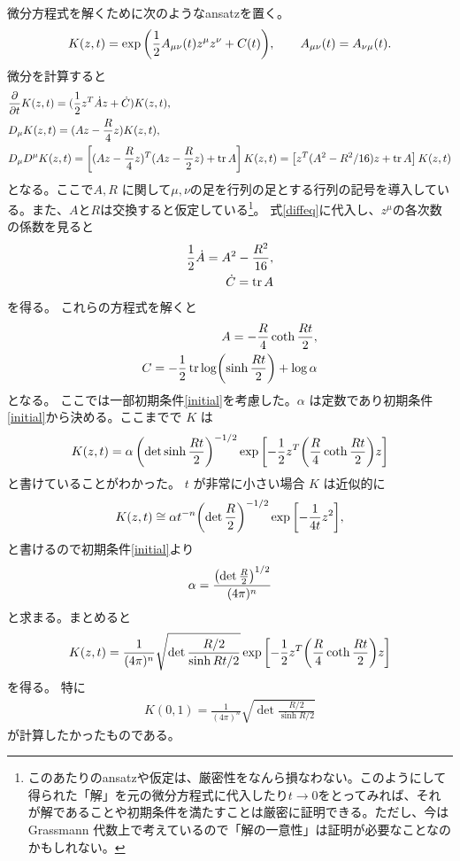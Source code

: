 \documentclass[12pt,a4paper]{jlreq}
\begin{document}
微分方程式を解くために次のようなansatzを置く。
\begin{align}
  K(z,t)=\exp\qty(\frac12 A_{\mu\nu}(t)z^{\mu}z^{\nu}+C(t)),\qquad A_{\mu\nu}(t)=A_{\nu\mu}(t).
\end{align}
微分を計算すると
\begin{align}
   & \pdv{t} K(z,t)=(\frac12 z^T \dot{A} z + \dot{C}) K(z,t),                                    \\
   & D_{\mu} K(z,t)=(A z - \frac{R}{4}z)K(z,t),                                                  \\
   & D_{\mu}D^{\mu}K(z,t)=\left[(A z - \frac{R}{4}z)^{T}(A z - \frac{R}{2}z)+\tr A\right] K(z,t)
  =\left[z^T(A^2-R^2/16)z+\tr A\right]K(z,t)
\end{align}
となる。ここで$A,R$ に関して$\mu,\nu$の足を行列の足とする行列の記号を導入している。また、$A$と$R$は交換すると仮定している\footnote{このあたりのansatzや仮定は、厳密性をなんら損なわない。このようにして得られた「解」を元の微分方程式に代入したり$t\to 0$をとってみれば、それが解であることや初期条件を満たすことは厳密に証明できる。ただし、今は Grassmann 
代数上で考えているので「解の一意性」は証明が必要なことなのかもしれない。}。
式\eqref{diffeq}に代入し、$z^{\mu}$の各次数の係数を見ると
\begin{align}
  \frac12 \dot{A}=A^2-\frac{R^2}{16}, \\
  \dot{C}=\tr A
\end{align}
を得る。
これらの方程式を解くと
\begin{align}
  A=-\frac{R}{4}\coth\frac{Rt}{2}, \\
  C=-\frac12 \tr \log(\sinh\frac{Rt}{2})+\log \alpha
\end{align}
となる。
ここでは一部初期条件\eqref{initial}を考慮した。$\alpha$ は定数であり初期条件\eqref{initial}から決める。ここまでで $K$ は
\begin{align}
  K(z,t)=\alpha \left(\det \sinh \frac{Rt}{2}\right)^{-1/2}
  \exp\qty[-\frac12 z^T \qty(\frac{R}{4}\coth\frac{Rt}{2}) z ]
\end{align}
と書けていることがわかった。
$t$ が非常に小さい場合 $K$ は近似的に
\begin{align}
  K(z,t)\cong \alpha t^{-n}\qty(\det \frac{R}{2})^{-1/2}
  \exp\qty[-\frac{1}{4t}z^2],
\end{align}
と書けるので初期条件\eqref{initial}より
\begin{align}
  \alpha=\frac{\qty(\det \frac{R}{2})^{1/2}}{(4\pi)^n}
\end{align}
と求まる。まとめると
\begin{align}
  K(z,t)=\frac{1}{(4\pi)^n}
  \sqrt{\det\frac{R/2}{\sinh Rt/2}}
  \exp\qty[-\frac12 z^T \qty(\frac{R}{4}\coth\frac{Rt}{2}) z ]
\end{align}
を得る。
特に
\begin{align}
  K(0,1)=\frac{1}{(4\pi)^n}
  \sqrt{\det\frac{R/2}{\sinh R/2}} \label{kernel}
\end{align}
が計算したかったものである。
\end{document}
